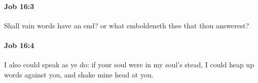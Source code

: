 		\paragraph{Job 16:3} %
			\label{JOB-16-3}

			Shall vain words have an end? or what emboldeneth thee that thou answerest?


		\paragraph{Job 16:4} %
			\label{JOB-16-4}

			I also could speak as ye do: if your soul were in my soul’s stead, I could heap up words against you, and shake mine head at you.


